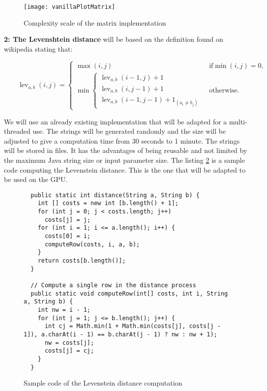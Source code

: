 \begin{figure}[h!]
\centering
\texttt{[image: vanillaPlotMatrix]}
\caption{Complexity scale of the matrix implementation}
\label{fig plot matrix}
\end{figure}


\textbf{2: The Levenshtein distance} will be based on the definition found on wikipedia\cite{levenshteinwiki} stating that:

$\qquad\operatorname{lev}_{a,b}(i,j) = \begin{cases}
  \max(i,j) & \text{ if} \min(i,j)=0, \\
  \min \begin{cases}
          \operatorname{lev}_{a,b}(i-1,j) + 1 \\
          \operatorname{lev}_{a,b}(i,j-1) + 1 \\
          \operatorname{lev}_{a,b}(i-1,j-1) + 1_{(a_i \neq b_j)}
       \end{cases} & \text{ otherwise.}
\end{cases}$

 We will use an already existing implementation\cite{levenshtein} that will be adapted for a multi-threaded use.
The strings will be generated randomly and the size will be adjusted to give a computation time from 30 seconds to 1 minute. The strings will be stored in files. It has the advantages of being reusable and not limited by the maximum Java string size or input parameter size. The listing \ref{listing leven} is a sample code computing the Levenstein distance. This is the one that will be adapted to be used on the GPU.

\begin{figure}[h!]
\begin{lstlisting}
  public static int distance(String a, String b) {
    int [] costs = new int [b.length() + 1];
    for (int j = 0; j < costs.length; j++)
      costs[j] = j;
    for (int i = 1; i <= a.length(); i++) {
      costs[0] = i;
      computeRow(costs, i, a, b);
    }
    return costs[b.length()];
  }

  // Compute a single row in the distance process
  public static void computeRow(int[] costs, int i, String a, String b) {
    int nw = i - 1;
    for (int j = 1; j <= b.length(); j++) {
      int cj = Math.min(1 + Math.min(costs[j], costs[j - 1]), a.charAt(i - 1) == b.charAt(j - 1) ? nw : nw + 1);
      nw = costs[j];
      costs[j] = cj;
    }
  }
\end{lstlisting}
\caption{Sample code of the Levenstein distance computation}
\label{listing leven}
\end{figure}


